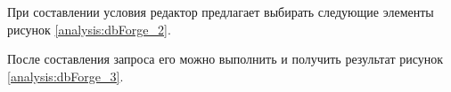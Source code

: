 \begin{figure}[ht!]
\end{figure}   

\newpage

При составлении условия редактор предлагает выбирать следующие элементы рисунок \ref{analysis:dbForge_2}.

\begin{figure}[ht!]
\end{figure}   

\newpage

После составления запроса его можно выполнить и получить результат рисунок \ref{analysis:dbForge_3}.

